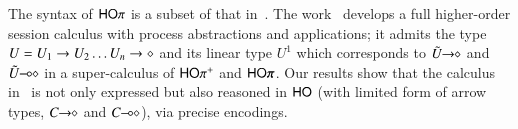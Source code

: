 The syntax of $\mathsf{HO}\pi$ is a subset of that in~\cite{tlca07,MostrousY15}.
The work~\cite{tlca07} develops a full higher-order session calculus
with process abstractions and applications; it admits the type 
$U=U_1 \rightarrow U_2 \dots U_n \rightarrow \diamond$ and its linear type 
$U^1$
which corresponds to $\tilde{U}\!\! \rightarrow\!\! \diamond$ and $\tilde{U}\!\! \multimap\!\! \diamond$ in 
a super-calculus of $\mathsf{HO\pi^{+}}$ and $\PHOp$. 
Our results show that
the calculus in~\cite{tlca07} is not only expressed but 
also reasoned in 
$\mathsf{HO}$ (with limited form of arrow types, $C\!\! \rightarrow\!\! \diamond$ and $C\!\! \multimap\!\! \diamond$), via precise encodings. 

